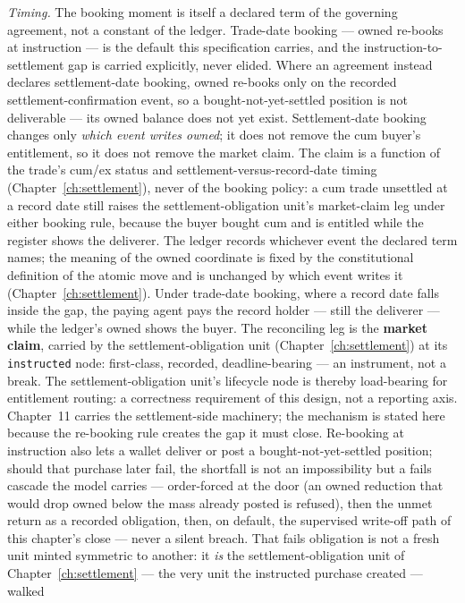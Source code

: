 \emph{Timing.} The booking moment is itself a declared term of the governing
agreement, not a constant of the ledger. Trade-date booking --- owned re-books at
instruction --- is the default this specification carries, and the
instruction-to-settlement gap is carried explicitly, never elided. Where an
agreement instead declares settlement-date booking, owned re-books only on the
recorded settlement-confirmation event, so a bought-not-yet-settled position is not
deliverable --- its owned balance does not yet exist. Settlement-date booking changes
only \emph{which event writes owned}; it does not remove the cum buyer's entitlement,
so it does not remove the market claim. The claim is a function of the trade's cum/ex
status and settlement-versus-record-date timing (Chapter~\ref{ch:settlement}), never
of the booking policy: a cum trade unsettled at a record date still raises the
settlement-obligation unit's market-claim leg under either booking rule, because the
buyer bought cum and is entitled while the register shows the deliverer. The ledger
records whichever event the declared term names; the meaning of the owned coordinate
is fixed by the constitutional definition of the atomic move and is unchanged by
which event writes it (Chapter~\ref{ch:settlement}). Under trade-date booking, where a
record date falls inside the gap, the paying agent pays the record holder ---
still the deliverer --- while the ledger's owned shows the buyer. The
reconciling leg is the \textbf{market claim}, carried by the
settlement-obligation unit (Chapter~\ref{ch:settlement}) at its \texttt{instructed}
node: first-class, recorded, deadline-bearing --- an instrument, not a break.
The settlement-obligation unit's lifecycle node is thereby load-bearing for
entitlement routing: a correctness requirement of this design, not a reporting
axis. Chapter~11 carries the settlement-side machinery; the mechanism is stated
here because the re-booking rule creates the gap it must close. Re-booking at instruction
also lets a wallet deliver or post a bought-not-yet-settled position; should
that purchase later fail, the shortfall is not an impossibility but a fails
cascade the model carries --- order-forced at the door (an owned reduction that
would drop owned below the mass already posted is refused), then the unmet
return as a recorded obligation, then, on default, the supervised write-off path
of this chapter's close --- never a silent breach. That fails obligation is not a
fresh unit minted symmetric to another: it \emph{is} the settlement-obligation unit of
Chapter~\ref{ch:settlement} --- the very unit the instructed purchase created --- walked
